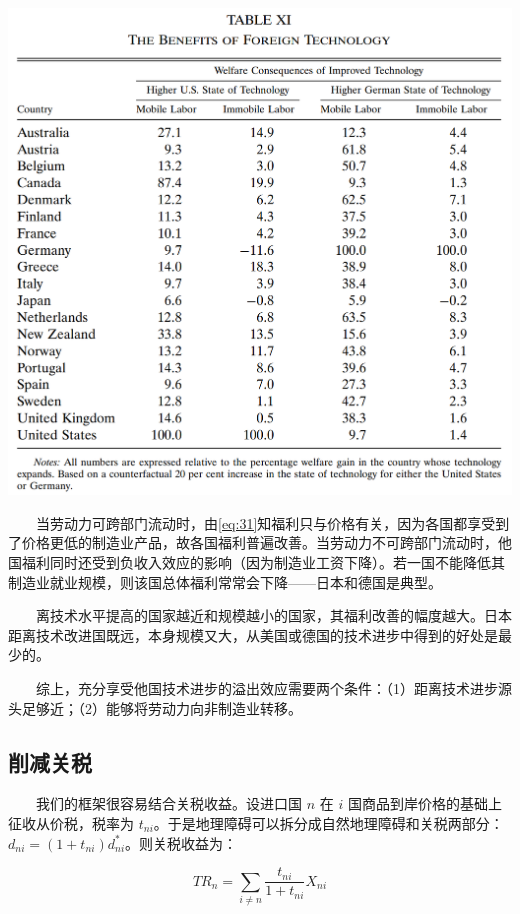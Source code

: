 \documentclass[]{article}
\begin{document}
\begin{center}\includegraphics[width=1\linewidth]{Figures/Table11} \end{center}

　　当劳动力可跨部门流动时，由\eqref{eq:31}知福利只与价格有关，因为各国都享受到了价格更低的制造业产品，故各国福利普遍改善。当劳动力不可跨部门流动时，他国福利同时还受到负收入效应的影响（因为制造业工资下降）。若一国不能降低其制造业就业规模，则该国总体福利常常会下降------日本和德国是典型。

　　离技术水平提高的国家越近和规模越小的国家，其福利改善的幅度越大。日本距离技术改进国既远，本身规模又大，从美国或德国的技术进步中得到的好处是最少的。

　　综上，充分享受他国技术进步的溢出效应需要两个条件：（1）距离技术进步源头足够近；（2）能够将劳动力向非制造业转移。

\hypertarget{section-29}{%
\subsection{削减关税}\label{section-29}}

　　我们的框架很容易结合关税收益。设进口国 \(n\) 在 \(i\) 国商品到岸价格的基础上征收从价税，税率为 \(t_{ni}\)。于是地理障碍可以拆分成自然地理障碍和关税两部分：\(d_{n i}=\left(1+t_{n i}\right) d_{n i}^{*}\)。则关税收益为：

\[
T R_{n}=\sum_{i \neq n} \frac{t_{n i}}{1+t_{n i}} X_{n i}
\]
\end{document}
